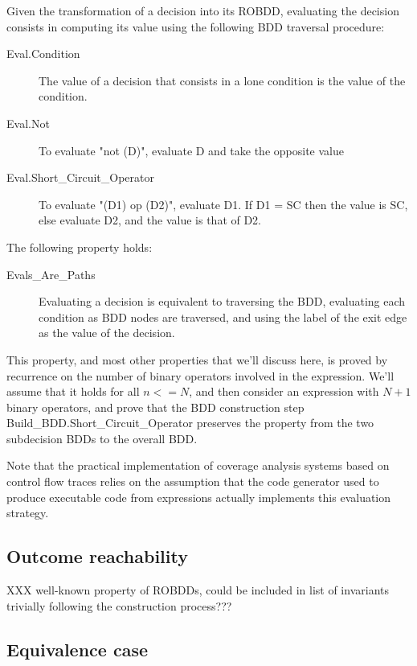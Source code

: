 \documentclass[a4paper,12pt,twoside]{article}
\begin{document}
Given the transformation of a decision into its ROBDD, evaluating the
decision consists in computing its value using the following BDD traversal
procedure:

\begin{description}
\item[Eval.Condition]
  The value of a decision that consists in a lone condition is the
  value of the condition.

\item[Eval.Not]
  To evaluate "not (D)", evaluate D and take the opposite value

\item[Eval.Short\_Circuit\_Operator]
  To evaluate "(D1) op (D2)", evaluate D1. If D1 = SC then the
  value is SC, else evaluate D2, and the value is that of D2.
\end{description}

The following property holds:

\begin{description}
\item[Evals\_Are\_Paths]
  Evaluating a decision is equivalent to traversing the BDD, evaluating
  each condition as BDD nodes are traversed, and using the label of the
  exit edge as the value of the decision.
\end{description}

This property, and most other properties that we'll discuss here,
is proved by recurrence on the number of binary operators involved in
the expression. We'll assume that it holds for all $n <= N$, and then
consider an expression with $N+1$ binary operators, and prove that
the BDD construction step Build\_BDD.Short\_Circuit\_Operator preserves
the property from the two subdecision BDDs to the overall BDD.

Note that the practical implementation of coverage analysis systems based
on control flow traces relies on the assumption that the code generator
used to produce executable code from expressions actually implements this
evaluation strategy.

\subsection{Outcome reachability}

XXX well-known property of ROBDDs, could be included in list
of invariants trivially following the construction process???

\subsection{Equivalence case}
\end{document}
